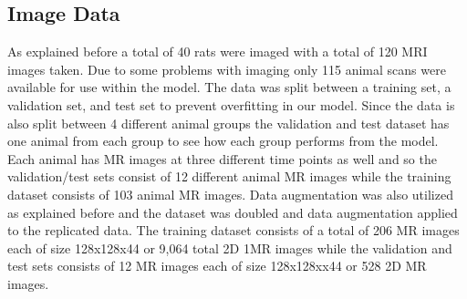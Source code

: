 \subsection{Image Data}
    As explained before a total of 40 rats were imaged with a total of 120 MRI images taken. 
    Due to some problems with imaging only 115 animal scans were available for use within the model. 
    The data was split between a training set, a validation set, and test set to prevent overfitting in our model. 
    Since the data is also split between 4 different animal groups the validation and test dataset has one animal from each group to see how each group performs from the model. 
   Each animal has MR images at three different time points as well and so the validation/test sets consist of 12 different animal MR images while the training dataset consists of 103 animal MR images. 
    Data augmentation was also utilized as explained before and the dataset was doubled and data augmentation applied to the replicated data. 
    The training dataset consists of a total of 206 MR images each of size 128x128x44 or 9,064 total 2D 1MR images while the validation and test sets consists of 12 MR images each of size 128x128xx44 or 528 2D MR images. 